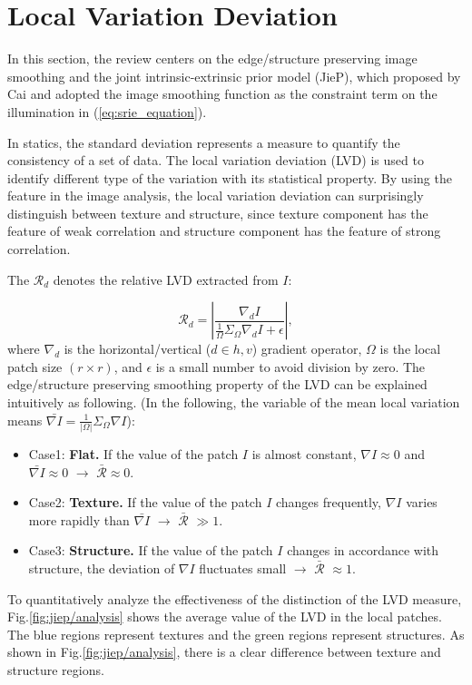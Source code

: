 \section{Local Variation Deviation} \label{sec:lvd}
In this section, the review centers on the edge/structure preserving image smoothing and the joint intrinsic-extrinsic prior model (JieP), which proposed by Cai \cite{jiep} and adopted the image smoothing function as the constraint term on the illumination in (\ref{eq:srie_equation}). 
\par
In statics, the standard deviation represents a measure to quantify the consistency of a set of data. The local variation deviation (LVD) is used to identify different type of the variation with its statistical property. By using the feature in the image analysis, the local variation deviation can surprisingly distinguish between texture and structure, since texture component has the feature of weak correlation and structure component has the feature of strong correlation. \par
The $\mathcal{R}_{d}$ denotes the relative LVD extracted from $I$:

\begin{equation}
\mathcal{R}_{d} = \left |\frac{\nabla_{d}{I}}{\frac{1}{\Omega}\Sigma_{\Omega}\nabla_{d}{I}+\epsilon} \right| ,
\label{eq:lvd}
\end{equation} 
where $\nabla_{d}$ is the horizontal/vertical ($d \in {h, v}$) gradient operator, $\Omega$ is the local patch size $(r \times r)$, and $\epsilon$ is a small number to avoid division by zero. 
The edge/structure preserving smoothing property of the LVD can be explained intuitively as following.
(In the following, the variable of the mean local variation means $\bar{\nabla{I}}= \frac{1}{|\Omega|} \Sigma_{\Omega}\nabla{I}$):

\begin{itemize}
\item Case1: \textbf{Flat.} If the value of the patch $I$ is almost constant, $\nabla{I} \approx 0$ and $\bar{\nabla{I}} \approx 0$ $\rightarrow$ $\bar{\mathcal{R}} \approx 0$. 
\item Case2: \textbf{Texture.} If the value of the patch $I$ changes frequently, $\nabla{I} $ varies more rapidly than $\bar{\nabla{I}}$ $\rightarrow$ $\bar{\mathcal{R}}$ $\gg 1$.
\item Case3: \textbf{Structure.} If the value of the patch $I$ changes in accordance with structure, the deviation of $\nabla{I}$ fluctuates small $\rightarrow$ $\bar{\mathcal{R}}$ $\approx 1$.
\end{itemize}
To quantitatively analyze the effectiveness of the distinction of the LVD measure, Fig.\ref{fig:jiep/analysis} shows the average value of the LVD in the local patches. The blue regions represent textures and the green regions represent structures. As shown in Fig.\ref{fig:jiep/analysis}, there is a clear difference between texture and structure regions.

